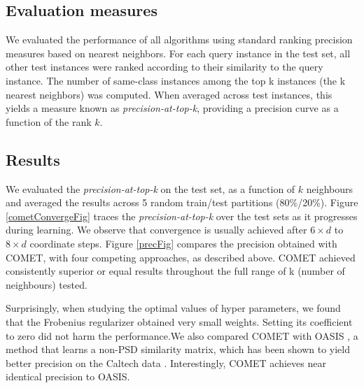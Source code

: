 \documentclass{article}
\begin{document}
\subsection{Evaluation measures}
We evaluated the performance of all algorithms using standard ranking precision measures based on nearest neighbors. For each query instance in the test set, all other test instances were ranked according to their similarity to the query instance. The number of same-class instances
among the top k instances (the k nearest neighbors) was computed. When averaged across test
instances, this yields a measure known as \textit{precision-at-top-k},
providing a precision curve as a function of the rank $k$.




\subsection{Results}
 We evaluated the \textit{precision-at-top-k} on the test set, as a function of $k$ neighbours and averaged the results across 5 random train/test partitions (80\%/20\%).
Figure \ref{cometConvergeFig} traces the \textit{precision-at-top-k} over the test sets as it progresses during learning. We observe that convergence is usually achieved after $6\times d$ to $8 \times d$ coordinate steps.
Figure \ref{precFig} compares the precision obtained with COMET, with four competing approaches, as described above. COMET achieved consistently superior or equal results throughout the full range of k (number of neighbours) tested. 

Surprisingly, when studying the optimal values of hyper parameters, we found that the Frobenius regularizer obtained very small weights. Setting its coefficient to zero did not harm the performance.We also compared COMET with OASIS , a method that learns a non-PSD similarity matrix, which has been shown to yield better precision on the Caltech data \cite{OASIS}. Interestingly, COMET achieves near identical precision to OASIS.
\end{document}

